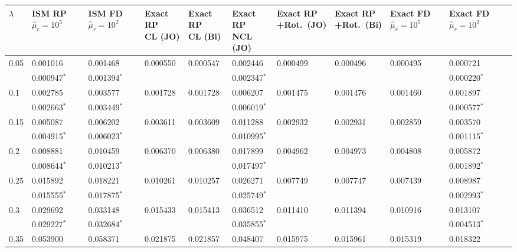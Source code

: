 \documentclass[../thesis.tex]{subfiles}
\begin{document}
\begin{landscape}
\newpage

\begin{longtable}{lllllllllll}%
\captionsetup{width=1.35\textwidth}
 \hline
 $\lambda$ & \makecell[l]{ISM RP\\$\hat{\mu}_r=10^5$} & \makecell[l]{ISM FD\\$\hat{\mu}_r=10^2$} & \makecell[l]{Exact RP\\CL (JO)} & \makecell[l]{Exact RP\\CL (Bi)} & \makecell[l]{Exact RP\\NCL (JO)} & \makecell[l]{Exact RP\\+Rot.\ (JO)} & \makecell[l]{Exact RP\\+Rot.\ (Bi)} & \makecell[l]{Exact FD\\$\hat{\mu}_r=10^5$} & \makecell[l]{Exact FD\\$\hat{\mu}_r=10^2$}
 \\\hline
 0.05 & 0.001016 & 0.001468 & 0.000550 & 0.000547 & 0.002446 & 0.000499 & 0.000496 & 0.000495 & 0.000721
 \\
 & 0.000947$^*$ & 0.001394$^*$ & & & 0.002347$^*$ & & & & 0.000220$^*$
 \\
 0.1 & 0.002785 & 0.003577 & 0.001728 & 0.001728 & 0.006207 & 0.001475 & 0.001476 & 0.001460 & 0.001897
 \\
 & 0.002663$^*$ & 0.003449$^*$ & & & 0.006019$^*$ & & & & 0.000577$^*$
 \\
 0.15 & 0.005087 & 0.006202 & 0.003611 & 0.003609 & 0.011288 & 0.002932 & 0.002931 & 0.002859 & 0.003570
 \\
 & 0.004915$^*$ & 0.006023$^*$ & & & 0.010995$^*$ & & & & 0.001115$^*$
 \\
 0.2 & 0.008881 & 0.010459 & 0.006370 & 0.006380 & 0.017899 & 0.004962 & 0.004973 & 0.004808 & 0.005872
 \\
 & 0.008644$^*$ & 0.010213$^*$ & & & 0.017497$^*$ & & & & 0.001892$^*$
 \\
 0.25 & 0.015892 & 0.018221 & 0.010261 & 0.010257 & 0.026271 & 0.007749 & 0.007747 & 0.007439 & 0.008987
 \\
 & 0.015555$^*$ & 0.017875$^*$ & & & 0.025749$^*$ & & & & 0.002993$^*$
 \\
 0.3 & 0.029692 & 0.033148 & 0.015433 & 0.015413 & 0.036512 & 0.011410 & 0.011394 & 0.010916 & 0.013107
 \\
 & 0.029227$^*$ & 0.032684$^*$ & & & 0.035855$^*$ & & & & 0.004513$^*$
 \\
 0.35 & 0.053900 & 0.058371 & 0.021875 & 0.021857 & 0.048407 & 0.015975 & 0.015961 & 0.015319 & 0.018322

\end{longtable}
\end{landscape}
\end{document}
